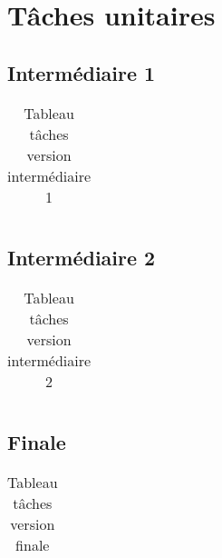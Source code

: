 \section{Tâches unitaires}
	\label{sec:taches_unitaires}

	\subsection{Intermédiaire 1}

		\begin{table}
			\centering
			\begin{tabular}{|l|l|l|}

			\end{tabular}
			\caption{Tableau tâches version intermédiaire 1}
			\label{fig:taches_units_1}
		\end{table}

	\subsection{Intermédiaire 2}

		\begin{table}
			\centering
			\begin{tabular}{|l|l|l|}

			\end{tabular}
			\caption{Tableau tâches version intermédiaire 2}
			\label{fig:taches_units_2}
		\end{table}

	\subsection{Finale}

		\begin{table}
			\centering
			\begin{tabular}{|l|l|l|}

			\end{tabular}
			\caption{Tableau tâches version finale}
			\label{fig:taches_units_3}
		\end{table}